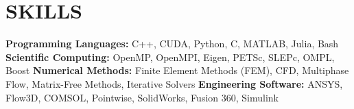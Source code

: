 \documentclass[letterpaper,11pt]{article}
\begin{document}
\section{SKILLS}
 \begin{itemize}[leftmargin=0.15in, label={}]
    \small{\item{
		\textbf{Programming Languages:} C++, CUDA, Python, C, MATLAB, Julia, Bash
		\textbf{Scientific Computing:} OpenMP, OpenMPI, Eigen, PETSc, SLEPc, OMPL, Boost
		\textbf{Numerical Methods:} Finite Element Methods (FEM), CFD, Multiphase Flow, Matrix-Free Methods, Iterative Solvers
		\textbf{Engineering Software:} ANSYS, Flow3D, COMSOL, Pointwise, SolidWorks, Fusion 360, Simulink
	}}
 \end{itemize}
 \vspace{-16pt}
\end{document}
